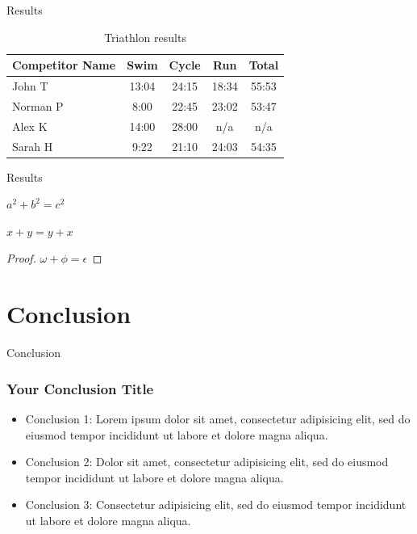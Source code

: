 \documentclass[10pt]{beamer}
\begin{document}
    \begin{frame}{Results}
        \begin{table}
            \begin{tabular}{l | c | c | c | c }
                Competitor Name & Swim  & Cycle & Run   & Total \\
                \hline \hline
                John T          & 13:04 & 24:15 & 18:34 & 55:53 \\
                Norman P        & 8:00  & 22:45 & 23:02 & 53:47 \\
                Alex K          & 14:00 & 28:00 & n/a   & n/a   \\
                Sarah H         & 9:22  & 21:10 & 24:03 & 54:35
            \end{tabular}
            \caption{Triathlon results}
            \label{tab:table}
        \end{table}
    \end{frame}

    \begin{frame}{Results}
        \begin{theorem}[Pythagoras]
            $ a^2 + b^2 = c^2$
        \end{theorem}
        \begin{corollary}
            $ x + y = y + x  $
        \end{corollary}
        \begin{proof}
            $\omega +\phi = \epsilon $
        \end{proof}
    \end{frame}


    \section{Conclusion}

    \begin{frame}{Conclusion}
        \frametitle{Your Conclusion Title}
        \begin{itemize}
            \item Conclusion 1: Lorem ipsum dolor sit amet, consectetur adipisicing elit, sed do eiusmod tempor incididunt ut labore et dolore magna aliqua.
            \item Conclusion 2: Dolor sit amet, consectetur adipisicing elit, sed do eiusmod tempor incididunt ut labore et dolore magna aliqua.
            \item Conclusion 3: Consectetur adipisicing elit, sed do eiusmod tempor incididunt ut labore et dolore magna aliqua.
        \end{itemize}
    \end{frame}
\end{document}
